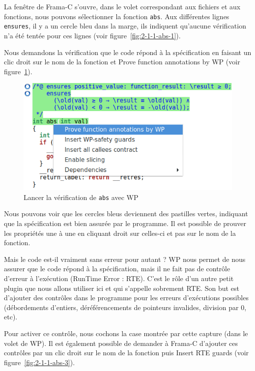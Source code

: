 \documentclass[12pt,francais,]{scrbook}
\begin{document}
La fenêtre de Frama-C s'ouvre, dans le volet correspondant aux fichiers
et aux fonctions, nous pouvons sélectionner la fonction \texttt{abs}.
Aux différentes lignes \texttt{ensures}, il y a un cercle bleu dans la
marge, ils indiquent qu'aucune vérification n'a été tentée pour ces
lignes (voir figure~\ref{fig:2-1-1-abs-1}).

Nous demandons la vérification que le code répond à la spécification en
faisant un clic droit sur le nom de la fonction et \og{}Prove function
annotations by WP\fg{} (voir figure~\ref{fig:2-1-1-abs-2}).

\begin{figure}[htbp]
\centering
\includegraphics[scale=0.5]{2-1-1-abs-2.png}
\caption{Lancer la vérification de \texttt{abs} avec WP}
\label{fig:2-1-1-abs-2}
\end{figure}

Nous pouvons voir que les cercles bleus deviennent des pastilles vertes,
indiquant que la spécification est bien assurée par le programme. Il est
possible de prouver les propriétés une à une en cliquant droit sur
celles-ci et pas sur le nom de la fonction.

Mais le code est-il vraiment sans erreur pour autant ? WP nous permet de
nous assurer que le code répond à la spécification, mais il ne fait pas
de contrôle d'erreur à l'exécution (RunTime Error : RTE). C'est le rôle
d'un autre petit plugin que nous allons utiliser ici et qui s'appelle
sobrement RTE. Son but est d'ajouter des contrôles dans le programme
pour les erreurs d'exécutions possibles (débordements d'entiers,
déréférencements de pointeurs invalides, division par 0, etc).

Pour activer ce contrôle, nous cochons la case montrée par cette capture
(dans le volet de WP). Il est également possible de demander à Frama-C
d'ajouter ces contrôles par un clic droit sur le nom de la fonction puis
\og{}Insert RTE guards\fg{} (voir figure~\ref{fig:2-1-1-abs-3}).
\end{document}
